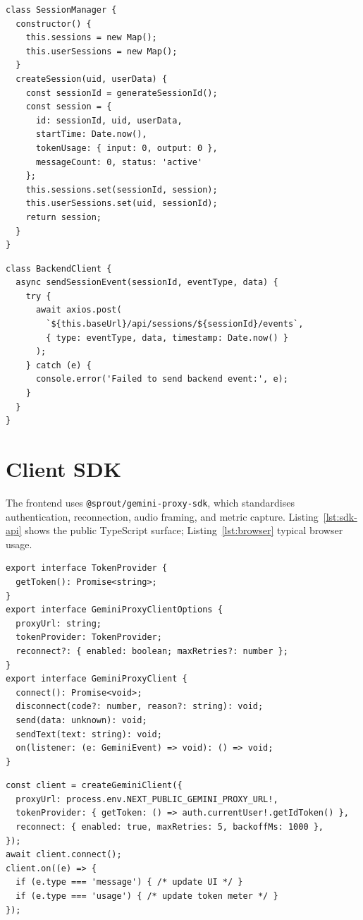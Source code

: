 \begin{lstlisting}[caption={Session manager (\texttt{session-manager.js}).},label=lst:session]
class SessionManager {
  constructor() {
    this.sessions = new Map();
    this.userSessions = new Map();
  }
  createSession(uid, userData) {
    const sessionId = generateSessionId();
    const session = {
      id: sessionId, uid, userData,
      startTime: Date.now(),
      tokenUsage: { input: 0, output: 0 },
      messageCount: 0, status: 'active'
    };
    this.sessions.set(sessionId, session);
    this.userSessions.set(uid, sessionId);
    return session;
  }
}
\end{lstlisting}

\begin{lstlisting}[caption={Backend event client.},label=lst:backend]
class BackendClient {
  async sendSessionEvent(sessionId, eventType, data) {
    try {
      await axios.post(
        `${this.baseUrl}/api/sessions/${sessionId}/events`,
        { type: eventType, data, timestamp: Date.now() }
      );
    } catch (e) {
      console.error('Failed to send backend event:', e);
    }
  }
}
\end{lstlisting}

\section{Client SDK}
\label{sec:sdk}

The frontend uses \texttt{@sprout/gemini-proxy-sdk}, which standardises authentication, reconnection, audio framing, and metric capture. Listing~\ref{lst:sdk-api} shows the public TypeScript surface; Listing~\ref{lst:browser} typical browser usage.

\begin{lstlisting}[caption={Public SDK API.},label=lst:sdk-api]
export interface TokenProvider {
  getToken(): Promise<string>;
}
export interface GeminiProxyClientOptions {
  proxyUrl: string;
  tokenProvider: TokenProvider;
  reconnect?: { enabled: boolean; maxRetries?: number };
}
export interface GeminiProxyClient {
  connect(): Promise<void>;
  disconnect(code?: number, reason?: string): void;
  send(data: unknown): void;
  sendText(text: string): void;
  on(listener: (e: GeminiEvent) => void): () => void;
}
\end{lstlisting}

\begin{lstlisting}[caption={Browser usage.},label=lst:browser]
const client = createGeminiClient({
  proxyUrl: process.env.NEXT_PUBLIC_GEMINI_PROXY_URL!,
  tokenProvider: { getToken: () => auth.currentUser!.getIdToken() },
  reconnect: { enabled: true, maxRetries: 5, backoffMs: 1000 },
});
await client.connect();
client.on((e) => {
  if (e.type === 'message') { /* update UI */ }
  if (e.type === 'usage') { /* update token meter */ }
});
\end{lstlisting}

